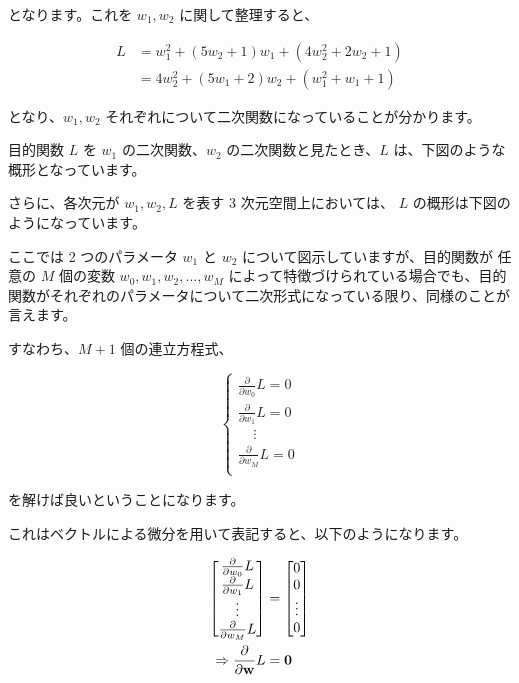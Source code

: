 となります。これを $w_1, w_2$ に関して整理すると、


\[
\begin{aligned}
L
&= w_1^2 + (5 w_2 + 1) w_1 + (4 w_2^2 + 2 w_2 + 1) \\
&= 4 w_2^2 + (5 w_1 + 2) w_2 + (w_1^2 + w_1 + 1)
\end{aligned}
\]


となり、$w_1, w_2$ それぞれについて二次関数になっていることが分かります。


目的関数 $L$ を $w_1$ の二次関数、$w_2$ の二次関数と見たとき、$L$ は、下図のような概形となっています。




さらに、各次元が $w_1, w_2, L$ を表す 3 次元空間上においては、 $L$ の概形は下図のようになっています。




ここでは 2 つのパラメータ $w_1$ と $w_2$ について図示していますが、目的関数が 任意の $M$ 個の変数 $w_0, w_1, w_2, \dots, w_M$ によって特徴づけられている場合でも、目的関数がそれぞれのパラメータについて二次形式になっている限り、同様のことが言えます。

すなわち、$M + 1$ 個の連立方程式、


\[
\begin{cases}
\frac {\partial }{\partial w_0}L = 0 \\
\frac {\partial }{\partial w_1}L = 0 \\
\ \ \ \ \ \vdots \\
\frac {\partial }{\partial w_M}L = 0 \\
\end{cases}
\]


を解けば良いということになります。

これはベクトルによる微分を用いて表記すると、以下のようになります。


\[
\begin{aligned}
\begin{bmatrix}
\frac {\partial}{\partial w_0} L \\
\frac {\partial}{\partial w_1} L \\
\vdots  \\
\frac {\partial}{\partial w_M} L \\
\end{bmatrix}
&=
\begin{bmatrix}
0 \\
0 \\
\vdots  \\
0 \\
\end{bmatrix} \\
\Rightarrow \frac {\partial}{\partial {\bf w}} L
&= {\bf 0} \\
\end{aligned}
\]


